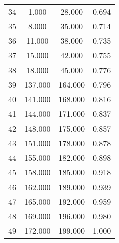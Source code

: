 \begin{tabular}{cccc}
  34 & 1.000 & 28.000 & 0.694 \\ 
  35 & 8.000 & 35.000 & 0.714 \\ 
  36 & 11.000 & 38.000 & 0.735 \\ 
  37 & 15.000 & 42.000 & 0.755 \\ 
  38 & 18.000 & 45.000 & 0.776 \\ 
  39 & 137.000 & 164.000 & 0.796 \\ 
  40 & 141.000 & 168.000 & 0.816 \\ 
  41 & 144.000 & 171.000 & 0.837 \\ 
  42 & 148.000 & 175.000 & 0.857 \\ 
  43 & 151.000 & 178.000 & 0.878 \\ 
  44 & 155.000 & 182.000 & 0.898 \\ 
  45 & 158.000 & 185.000 & 0.918 \\ 
  46 & 162.000 & 189.000 & 0.939 \\ 
  47 & 165.000 & 192.000 & 0.959 \\ 
  48 & 169.000 & 196.000 & 0.980 \\ 
  49 & 172.000 & 199.000 & 1.000 \\ 
   \hline
\end{tabular}
